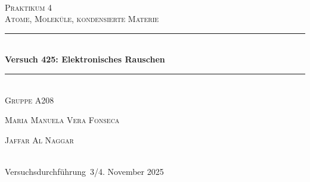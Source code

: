 

\setlength\headheight{24pt}
\setlength\footheight{15pt}
\chead{}						%
\ohead{\textbf{\headmark}}		%
\cfoot*{\pagemark}				%
\renewcommand*\chapterheadstartvskip{\vspace*{-1cm}}




\begin{titlepage}
\newcommand{\HRule}{\rule{\linewidth}{0.5mm}}
\center
\textsc{\LARGE }\\[1.5cm] %
\textsc{\LARGE Praktikum 4}\\[0.5cm] %
\textsc{\large Atome, Moleküle, kondensierte Materie}\\[0.5cm] %

\HRule \\[0.4cm]
{ \huge \bfseries Versuch 425: Elektronisches Rauschen }\\[0.4cm] %
\HRule \\[0.2cm]
\Large{\textsc{Gruppe A208}}\\[0.2cm]
 
\begin{minipage}{0.4\textwidth}
\vspace{0.7em}
\begin{flushleft} \large
\textsc{Maria Manuela Vera Fonseca} %
\end{flushleft}
\end{minipage}
\begin{minipage}{0.4\textwidth}
\begin{flushright} \large
\textsc{Jaffar Al Naggar}
\end{flushright}
\end{minipage}\\[2.0cm]

{\large Versuchsdurchführung\, 3/4. November 2025 }\\[8cm] %


\end{titlepage}
